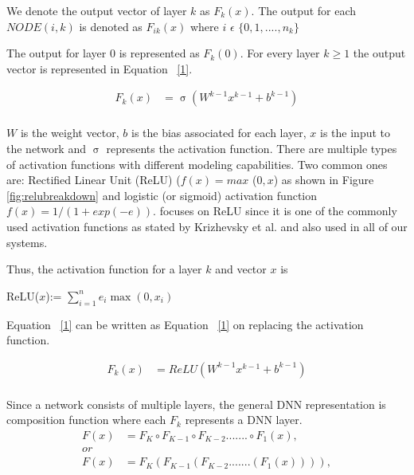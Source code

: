 We denote the output vector of layer $k$ as $F_k(x)$.
The output for each $NODE(i,k)$ is denoted as $F_{ik}(x)$ where $i$ $\epsilon$ $\{0,1,....,n_k\}$ 

The output for layer 0 is represented as $F_k(0)$.
For every layer $k \geq 1$ the output vector is represented in Equation ~\ref{1}. 

\begin{equation}
\label{1}
\begin{aligned}
F_k(x) &= \upsigma(W^{k-1}x^{k-1} + b^{k-1}) \\
\end{aligned}
\end{equation}

$W$ is the weight vector, $b$ is the bias associated for each layer, $x$ is the input to the network and $\upsigma$ represents the activation function. 
There are multiple types of activation functions with different modeling capabilities. Two common ones are: Rectified Linear Unit (ReLU) ($f(x) = max$ (${0,x}$) as shown in Figure \ref{fig:relubreakdown} and logistic (or sigmoid) activation function $f(x)=1/(1+ exp(-e))$.
\tool focuses on ReLU  since it is one of the commonly used activation functions as stated by Krizhevsky et al. \cite{10.1145/3065386} and also used in all of our systems.

Thus, the activation function for a layer $k$ and vector $x$ is 

ReLU($x$):= $\sum_{i=1}^{n} e_{i}\max(0, x_{i})$ 


Equation ~\ref{1} can be written as Equation ~\ref{1} on replacing the activation function. 

\begin{equation}
\label{2}
\begin{aligned}
F_k(x) &= ReLU(W^{k-1}x^{k-1} + b^{k-1}) \\
\end{aligned}
\end{equation}

Since a network consists of multiple layers, the general \ac{DNN} representation is composition function where each $F_k$ represents a \ac{DNN} layer. 
\begin{equation}
\label{3}
	\begin{aligned}
	F(x) &= F_K \circ F_{K-1} \circ F_{K-2} ....... \circ F_1(x),    \\
	or \\
	F(x) &= F_K ( F_{K-1}( F_{K-2} .......  (F_1(x)))),    \\
	\end{aligned}
\end{equation}

